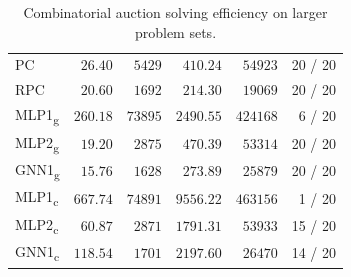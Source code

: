 \begin{scriptsize}
\begin{table}[ht]
\begin{tabular}{lrrrrr}
		PC  &  $26.40 $ & $5429 $ & $410.24 $ & $54923 $ & 20 / 20\\
		RPC &  $20.60 $ & $1692 $ & $214.30 $ & $19069 $ & 20 / 20\\
		\addlinespace
		MLP1\textsubscript{g}  & $260.18$ & $73895$ & $2490.55$ & $424168$ & 6 / 20\\
		MLP2\textsubscript{g} &  $19.20$ & $2875$ & $470.39$ & $53314$ & 20 / 20\\
		GNN1\textsubscript{g} & $15.76$ & $1628$ & $273.89$ & $25879$ & 20 / 20\\
		\addlinespace
		MLP1\textsubscript{c} &  $667.74 $ & $74891 $ & $9556.22 $ & $463156 $ & 1 / 20\\
		MLP2\textsubscript{c} &  $60.87 $ & $2871$ & $1791.31 $ & $53933 $ & 15 / 20\\
		GNN1\textsubscript{c} & $118.54 $ & $1701 $ & $2197.60 $ & $26470 $ & 14 / 20\\
		\bottomrule
	\end{tabular}
	\caption{Combinatorial auction solving efficiency on larger problem sets.}\label{tab:results_trans_cauction}
\end{table}
\end{scriptsize}
%


